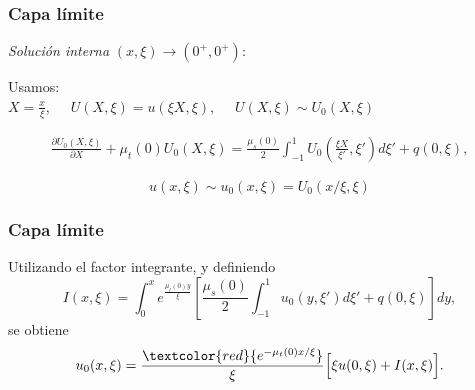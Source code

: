 \begin{frame}
\frametitle{Capa límite}

\textit{Solución interna}  $(x,\xi)\to (0^+,0^+)$:

\vspace{0.05\textheight}
Usamos: \\
$X=\frac{x}{\xi},\quad$ $U(X,\xi)=u(\xi X,\xi),\quad$ 
$U(X,\xi) \sim U_0(X,\xi)$

\begin{equation*}
\begin{split}
 \frac{\partial U_0(X,\xi)}{\partial X} + \mu_t(0) U_0(X,\xi)=\frac{\mu_s(0)}{2} 
\int_{-1}^{1} U_0\left(\frac{\xi X}{\xi'},\xi'\right) d\xi' +q(0,\xi),
\end{split}
\end{equation*}

\begin{equation*}
  u(x,\xi)\sim u_0(x,\xi) = U_0(x/\xi,\xi)
\end{equation*}

\end{frame}
\begin{frame}
\frametitle{Capa límite}

Utilizando el factor integrante, y definiendo
\begin{equation*}
I(x,\xi) = \int_0^{x} e^{\frac{ \mu_t(0) y}{\xi}}\left[\frac{\mu_s(0)}{2} \int_{-1}^1u_0(y,\xi')d\xi'+q(0,\xi)\right]dy,
\end{equation*}
se obtiene
\begin{equation*}
 u_0(x,\xi) = \frac{\textcolor{red}{e^{-\mu_t(0)x/\xi}}}{\xi} \Big[\xi u(0,\xi)+I(x,\xi)\Big] .
\end{equation*}

\end{frame}


